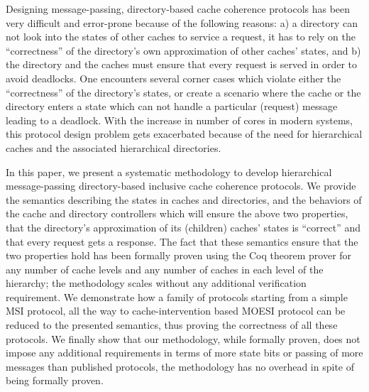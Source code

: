 Designing message-passing, directory-based cache coherence protocols has been
very difficult and error-prone because of the following reasons: a) a directory
can not look into the states of other caches to service a request, it has to
rely on the ``correctness'' of the directory's own approximation of other
caches' states, and b) the directory and the caches must ensure that every
request is served in order to avoid deadlocks. One encounters several corner
cases which violate either the ``correctness'' of the directory's states, or
create a scenario where the cache or the directory enters a state which can not
handle a particular (request) message leading to a deadlock. With the increase
in number of cores in modern systems, this protocol design problem gets
exacerbated because of the need for hierarchical caches and the associated
hierarchical directories.

In this paper, we present a systematic methodology to develop hierarchical
message-passing directory-based inclusive cache coherence protocols. We provide
the semantics describing the states in caches and directories, and the
behaviors of the cache and directory controllers which will ensure the above
two properties, \viz that the directory's approximation of its (children)
caches' states is ``correct'' and that every request gets a response. The fact
that these semantics ensure that the two properties hold has been formally
proven using the Coq theorem prover for any number of cache levels and any
number of caches in each level of the hierarchy; the methodology scales without
any additional verification requirement. We demonstrate how a family of
protocols starting from a simple MSI protocol, all the way to
cache-intervention based MOESI protocol can be reduced to the presented
semantics, thus proving the correctness of all these protocols. We finally show
that our methodology, while formally proven, does not impose any additional
requirements in terms of more state bits or passing of more messages than
published protocols, \ie the methodology has no overhead in spite of being
formally proven.
